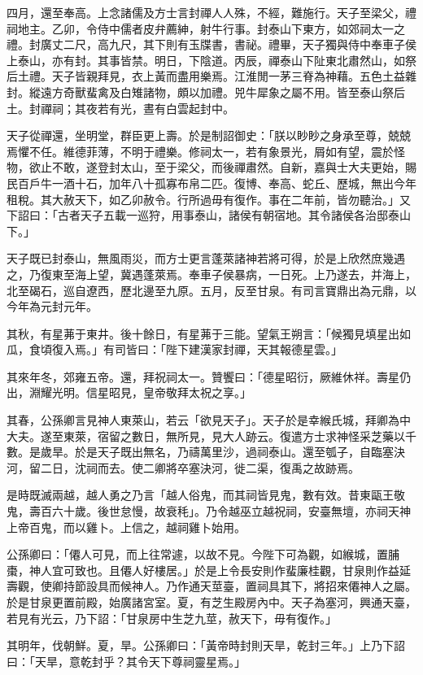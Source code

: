 \begin{pinyinscope}
四月，還至奉高。上念諸儒及方士言封禪人人殊，不經，難施行。天子至梁父，禮祠地主。乙卯，令侍中儒者皮弁薦紳，射牛行事。封泰山下東方，如郊祠太一之禮。封廣丈二尺，高九尺，其下則有玉牒書，書祕。禮畢，天子獨與侍中奉車子侯上泰山，亦有封。其事皆禁。明日，下陰道。丙辰，禪泰山下阯東北肅然山，如祭后土禮。天子皆親拜見，衣上黃而盡用樂焉。江淮閒一茅三脊為神藉。五色土益雜封。縱遠方奇獸蜚禽及白雉諸物，頗以加禮。兕牛犀象之屬不用。皆至泰山祭后土。封禪祠；其夜若有光，晝有白雲起封中。

天子從禪還，坐明堂，群臣更上壽。於是制詔御史：「朕以眇眇之身承至尊，兢兢焉懼不任。維德菲薄，不明于禮樂。修祠太一，若有象景光，屑如有望，震於怪物，欲止不敢，遂登封太山，至于梁父，而後禪肅然。自新，嘉與士大夫更始，賜民百戶牛一酒十石，加年八十孤寡布帛二匹。復博、奉高、蛇丘、歷城，無出今年租稅。其大赦天下，如乙卯赦令。行所過毋有復作。事在二年前，皆勿聽治。」又下詔曰：「古者天子五載一巡狩，用事泰山，諸侯有朝宿地。其令諸侯各治邸泰山下。」

天子既已封泰山，無風雨災，而方士更言蓬萊諸神若將可得，於是上欣然庶幾遇之，乃復東至海上望，冀遇蓬萊焉。奉車子侯暴病，一日死。上乃遂去，并海上，北至碣石，巡自遼西，歷北邊至九原。五月，反至甘泉。有司言寶鼎出為元鼎，以今年為元封元年。

其秋，有星茀于東井。後十餘日，有星茀于三能。望氣王朔言：「候獨見填星出如瓜，食頃復入焉。」有司皆曰：「陛下建漢家封禪，天其報德星雲。」

其來年冬，郊雍五帝。還，拜祝祠太一。贊饗曰：「德星昭衍，厥維休祥。壽星仍出，淵耀光明。信星昭見，皇帝敬拜太祝之享。」

其春，公孫卿言見神人東萊山，若云「欲見天子」。天子於是幸緱氏城，拜卿為中大夫。遂至東萊，宿留之數日，無所見，見大人跡云。復遣方士求神怪采芝藥以千數。是歲旱。於是天子既出無名，乃禱萬里沙，過祠泰山。還至瓠子，自臨塞決河，留二日，沈祠而去。使二卿將卒塞決河，徙二渠，復禹之故跡焉。

是時既滅兩越，越人勇之乃言「越人俗鬼，而其祠皆見鬼，數有效。昔東甌王敬鬼，壽百六十歲。後世怠慢，故衰秏」。乃令越巫立越祝祠，安臺無壇，亦祠天神上帝百鬼，而以雞卜。上信之，越祠雞卜始用。

公孫卿曰：「僊人可見，而上往常遽，以故不見。今陛下可為觀，如緱城，置脯棗，神人宜可致也。且僊人好樓居。」於是上令長安則作蜚廉桂觀，甘泉則作益延壽觀，使卿持節設具而候神人。乃作通天莖臺，置祠具其下，將招來僊神人之屬。於是甘泉更置前殿，始廣諸宮室。夏，有芝生殿房內中。天子為塞河，興通天臺，若見有光云，乃下詔：「甘泉房中生芝九莖，赦天下，毋有復作。」

其明年，伐朝鮮。夏，旱。公孫卿曰：「黃帝時封則天旱，乾封三年。」上乃下詔曰：「天旱，意乾封乎？其令天下尊祠靈星焉。」


\end{pinyinscope}
